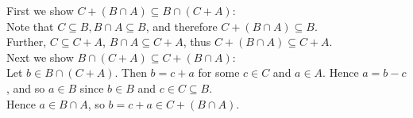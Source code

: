 \documentclass[12pt]{article}
\begin{document}
First we show $C+(B \cap A) \subseteq B \cap (C+A)$:\\
Note that $C \subseteq B, B \cap A \subseteq B$, and therefore $C + (B \cap A) \subseteq B$.\\
Further, $C \subseteq C+A$, $B \cap A \subseteq C+A$, thus
$C+(B \cap A) \subseteq C+A$.\\

Next we show $B \cap (C+A) \subseteq C+(B \cap A)$:\\
Let $b \in B \cap (C+A)$.  Then $b=c+a$ for some $c \in C$ and $a \in A$.
Hence $a=b-c$, and so $a \in B$ since $b \in B$ and $c \in C \subseteq B$.\\
Hence $a \in B \cap A$, so $b = c+a \in C+(B \cap A)$.
\end{document}
